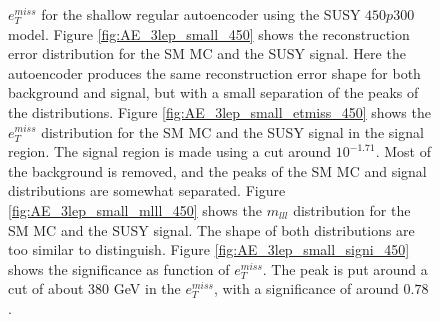 \begin{figure}[H]
{    $e_T^{miss}$ for the shallow regular autoencoder using the SUSY $450p300$ model. Figure \ref{fig:AE_3lep_small_450} shows the reconstruction error 
    distribution for the SM MC and the SUSY signal. Here the autoencoder produces the same reconstruction error shape for both background and 
    signal, but with a small separation of the peaks of the distributions. Figure \ref{fig:AE_3lep_small_etmiss_450} shows the $e_T^{miss}$ 
    distribution for the SM MC and the SUSY signal in the signal region. The signal region is made using a cut around $10^{-1.71}$. Most of 
    the background is removed, and the peaks of the SM MC and signal distributions are somewhat separated. Figure 
    \ref{fig:AE_3lep_small_mlll_450} shows the $m_{lll}$ distribution for the SM MC and the SUSY signal. 
    The shape of both distributions are too similar to distinguish. Figure \ref{fig:AE_3lep_small_signi_450} shows the significance as 
    function of $e_T^{miss}$. The peak is put around a cut of about 380 GeV in the $e_T^{miss}$, with a significance of around $0.78$.}
    \label{fig:AE_3lep_small_rec_sig_signi_450}
\end{figure}









